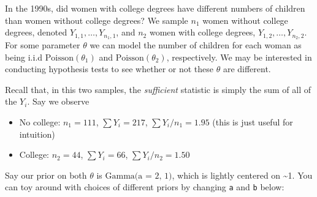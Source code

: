 \documentclass[]{article}
\providecommand{\tightlist}{%
  \setlength{\itemsep}{0pt}\setlength{\parskip}{0pt}}
\begin{document}
In the 1990s, did women with college degrees have different numbers of
children than women without college degrees? We sample \(n_1\) women
without college degrees, denoted \(Y_{1,1}, \dots, Y_{n_1, 1}\), and
\(n_2\) women with college degrees, \(Y_{1, 2}, \dots, Y_{n_2, 2}\). For
some parameter \(\theta\) we can model the number of children for each
woman as being i.i.d \(\text{Poisson}(\theta_1)\) and
\(\text{Poisson}(\theta_2)\), respectively. We may be interested in
conducting hypothesis tests to see whether or not these \(\theta\) are
different.

Recall that, in this two samples, the \emph{sufficient} statistic is
simply the sum of all of the \(Y_i\). Say we observe

\begin{itemize}
\tightlist
\item
  No college: \(n_1 = 111\), \(\sum Y_i = 217\),
  \(\sum Y_i / n_1 = 1.95\) (this is just useful for intuition)
\item
  College: \(n_2 = 44\), \(\sum Y_i = 66\), \(\sum Y_i / n_2 = 1.50\)
\end{itemize}

Say our prior on both \(\theta\) is \(\text{Gamma(a = 2, 1)}\), which is
lightly centered on \textasciitilde{}1. You can toy around with choices
of different priors by changing \texttt{a} and \texttt{b} below:
\end{document}
